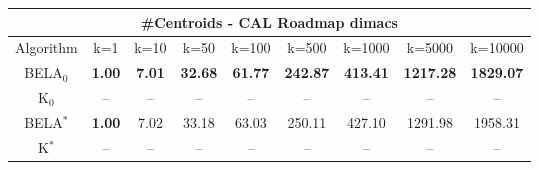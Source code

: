 \begin{tabular}{c|cccccccc}\toprule
\multicolumn{9}{c}{#Centroids - CAL Roadmap dimacs}\\ \midrule
Algorithm & k=1 & k=10 & k=50 & k=100 & k=500 & k=1000 & k=5000 & k=10000 \\ \midrule
BELA$_0$ & \textbf{1.00} & \textbf{7.01} & \textbf{32.68} & \textbf{61.77} & \textbf{242.87} & \textbf{413.41} & \textbf{1217.28} & \textbf{1829.07} \\
K$_0$ & -- & -- & -- & -- & -- & -- & -- & -- \\
BELA$^*$ & \textbf{1.00} & 7.02 & 33.18 & 63.03 & 250.11 & 427.10 & 1291.98 & 1958.31 \\
K$^*$ & -- & -- & -- & -- & -- & -- & -- & -- \\ \bottomrule 
\end{tabular}
